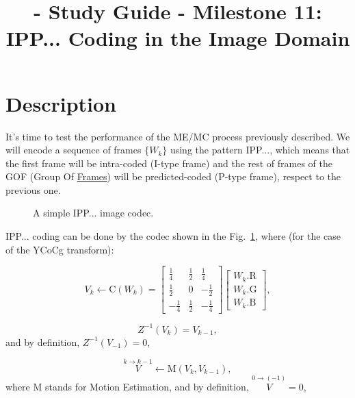 
\title{\SM{} - Study Guide - Milestone 11: IPP... Coding in the Image Domain}

\maketitle

\tableofcontents

\section{Description}

It's time to test the performance of the ME/MC process previously
described. We will encode a sequence of frames $\{W_k\}$ using the
pattern IPP..., which means that the first frame will be intra-coded
(I-type frame) and the rest of frames of the GOF (Group Of
\href{https://en.wikipedia.org/wiki/Group_of_pictures}{Frames}) will
be predicted-coded (P-type frame), respect to the previous one.

\begin{figure}
  \centering
  \caption{A simple IPP... image codec.}
\label{fig:IPP_codec}
\end{figure}

IPP... coding can be done by the codec shown in the
Fig.~\ref{fig:IPP_codec}, where (for the case of the YCoCg transform):

\begin{equation}
  V_k \leftarrow \text{C}(W_k) =
  \begin{bmatrix}
    \frac{1}{4} &  \frac{1}{2}  &  \frac{1}{4} \\ 
    \frac{1}{2} &            0  & -\frac{1}{2} \\
    -\frac{1}{4} &  \frac{1}{2}  & -\frac{1}{4}
  \end{bmatrix}
  \begin{bmatrix}
    W_k.\text{R} \\
    W_k.\text{G} \\
    W_k.\text{B}
  \end{bmatrix}
  , \tag{a}
\end{equation}

\begin{equation}
  Z^{-1}(V_k) = V_{k-1},
  \tag{b}
\end{equation}
and by definition, $Z^{-1}(V_{-1}) = 0$,

\begin{equation}
  \overset{k\rightarrow k-1}{V} \leftarrow \text{M}(V_k, V_{k-1}),
  \tag{c}
\end{equation}
where M stands for Motion Estimation, and by definition,
$\overset{0\rightarrow (-1)}{V}=0$,

